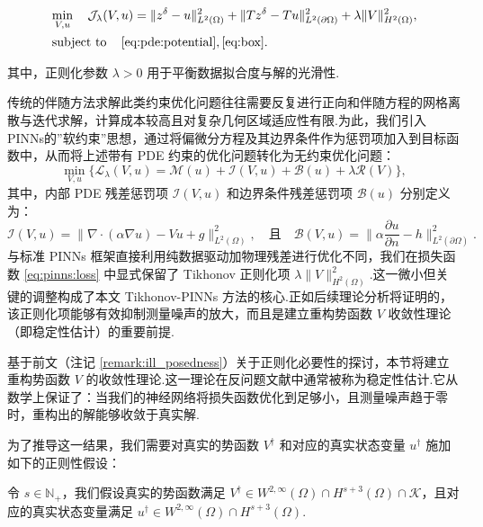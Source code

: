 \begin{align*}
&\min_{V,u}\quad\mathcal{J}_{\lambda}(V,u)=\|z^{\delta}-u\|_{L^{2}(\Omega)}^{2}+\|Tz^{\delta}-Tu\|_{L^{2}(\partial\Omega)}^{2}+\lambda\|V\|_{H^{2}(\Omega)}^{2}, \\
&\operatorname{subject~to}\quad \eqref{eq:pde:potential}, \eqref{eq:box}.
\end{align*}

其中，正则化参数 $\lambda > 0$ 用于平衡数据拟合度与解的光滑性.

传统的伴随方法求解此类约束优化问题往往需要反复进行正向和伴随方程的网格离散与迭代求解，计算成本较高且对复杂几何区域适应性有限.为此，我们引入PINNs的”软约束”思想，通过将偏微分方程及其边界条件作为惩罚项加入到目标函数中，从而将上述带有 PDE 约束的优化问题转化为无约束优化问题：
\begin{equation}\label{eq:pinns:loss}
\min_{V,u} \{ \mathcal{L}_{\lambda}(V,u) = \mathcal{M}(u)+\mathcal{I}(V,u)+\mathcal{B}(u) +\lambda\mathcal{R}(V)\},
\end{equation}
其中，内部 PDE 残差惩罚项 $\mathcal{I}(V,u)$ 和边界条件残差惩罚项 $\mathcal{B}(u)$ 分别定义为：
\begin{equation*}
\mathcal{I}(V,u)=\|\nabla\cdot(\alpha\nabla u)-Vu+g\|_{L^{2}(\Omega)}^{2}, \quad \text{且} \quad
\mathcal{B}(V,u)=\|\alpha\frac{\partial u}{\partial n}-h\|_{L^{2}(\partial\Omega)}^{2}.
\end{equation*}
与标准 PINNs 框架直接利用纯数据驱动加物理残差进行优化不同，我们在损失函数 \eqref{eq:pinns:loss} 中显式保留了 Tikhonov 正则化项 $\lambda\|V\|_{H^{2}(\Omega)}^{2}$.这一微小但关键的调整构成了本文 Tikhonov-PINNs 方法的核心.正如后续理论分析将证明的，该正则化项能够有效抑制测量噪声的放大，而且是建立重构势函数 $V$ 收敛性理论（即稳定性估计）的重要前提.

基于前文（注记 \ref{remark:ill_posedness}）关于正则化必要性的探讨，本节将建立重构势函数 $V$ 的收敛性理论.这一理论在反问题文献中通常被称为稳定性估计.它从数学上保证了：当我们的神经网络将损失函数优化到足够小，且测量噪声趋于零时，重构出的解能够收敛于真实解.

为了推导这一结果，我们需要对真实的势函数 $V^\dagger$ 和对应的真实状态变量 $u^\dagger$ 施加如下的正则性假设：

\begin{assumption}\label{ass:potential:Vdaggerreg}
令 $s \in \mathbb{N}_+$，我们假设真实的势函数满足 $V^\dagger \in W^{2,\infty}(\Omega) \cap H^{s+3}(\Omega) \cap \mathcal{K}$，且对应的真实状态变量满足 $u^\dagger \in W^{2,\infty}(\Omega) \cap H^{s+3}(\Omega)$.
\end{assumption}

